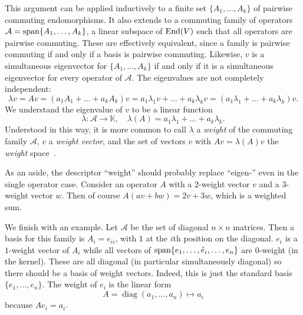 This argument can be applied inductively to a finite set $\{A_1,\dots,A_k\}$ of pairwise commuting endomorphisms.
It also extends to a commuting family of operators $\mathcal{A} = \operatorname{span}\{A_1,\dots,A_k\}$, a linear subspace of $\operatorname{End}(V)$ such that all operators are pairwise commuting.
These are effectively equivalent, since a family is pairwise commuting if and only if a basis is pairwise commuting.
Likewise, $v$ is a simultaneous eigenvector for $\{A_1,\dots,A_k\}$ if and only if it is a simultaneous eigenvector for every operator of $\mathcal{A}$.
The eigenvalues are not completely independent:
\[
\lambda v
= Av 
= (a_1A_1 + \dots + a_kA_k)v
= a_1 \lambda_1 v + \dots + a_k \lambda_k v
= (a_1 \lambda_1 + \dots + a_k \lambda_k )v.
\]
We understand the eigenvalue of $v$ to be a linear function 
\[
\lambda : \mathcal{A} \to \mathbb{K}, 
\quad
\lambda(A) = a_1 \lambda_1 + \dots + a_k \lambda_k .
\]
Understood in this way, it is more common to call $\lambda$ a \emph{weight} of the commuting family $\mathcal{A}$, $v$ a \emph{weight vector}, and the set of vectors $v$ with $Av = \lambda(A)v$ the \emph{weight} space~\cite[Definition~A.14]{Hall2015}.

As an aside, the descriptor ``weight'' should probably replace ``eigen-'' even in the single operator case.
Consider an operator $A$ with a $2$-weight vector $v$ and a $3$-weight vector $w$.
Then of course $A(av+bw) = 2v + 3w$, which is a weighted sum.

We finish with an example.
Let $\mathcal{A}$ be the set of diagonal $n\times n$ matrices.
Then a basis for this family is $A_i = e_{ii}$, with $1$ at the $i$th position on the diagonal.
$e_i$ is a $1$-weight vector of $A_i$ while all vectors of $\operatorname{span}\{e_1,\dots,\hat{e}_i,\dots,e_n\}$ are $0$-weight (in the kernel).
These are all diagonal (in particular simultaneously diagonal) so there should be a basis of weight vectors.
Indeed, this is just the standard basis $\{e_1,\dots,e_n\}$.
The weight of $e_i$ is the linear form
\[
A = \operatorname{diag}(a_1,\dots,a_n) \mapsto a_i
\]
because $A e_i = a_i$.

